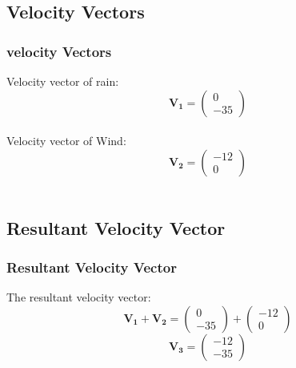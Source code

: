 \documentclass{beamer}
\theoremstyle{remark}
\let\vec\mathbf
\numberwithin{equation}{section}
\begin{document}
\subsection{Velocity Vectors}
\begin{frame}
\frametitle{velocity Vectors}
Velocity vector of rain:\\
\begin{equation}
\vec{V_{1}}=\begin{pmatrix}
0\\
-35
\end{pmatrix}
\end{equation}\\
Velocity vector of Wind:\\
\begin{equation}
\vec{V_{2}}=\begin{pmatrix}
-12\\
0
\end{pmatrix}
\end{equation}\\
\end{frame}
\subsection{Resultant Velocity Vector}
\begin{frame}
\frametitle{Resultant Velocity Vector}
The resultant velocity vector:\\
\begin{equation}
\vec{V_{1}}+\vec{V_{2}}=\begin{pmatrix}
    0\\
    -35
\end{pmatrix}
+
\begin{pmatrix}
    -12\\
    0
\end{pmatrix}
\end{equation}
\begin{equation}
    \vec{V_{3}}=\begin{pmatrix}
        -12\\
        -35
    \end{pmatrix}
\end{equation}
\end{frame}
\end{document}
